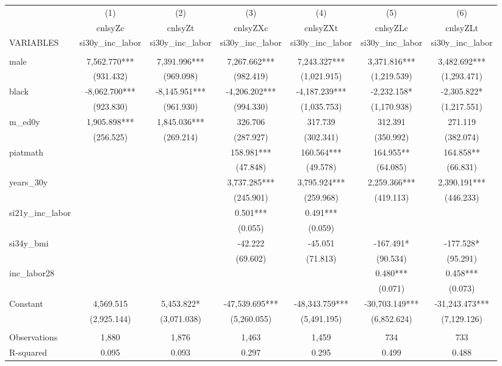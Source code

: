 \begin{tabular}{lcccccc} \hline
 & (1) & (2) & (3) & (4) & (5) & (6) \\
 & cnlsyZc & cnlsyZt & cnlsyZXc & cnlsyZXt & cnlsyZLc & cnlsyZLt \\
VARIABLES & si30y\_inc\_labor & si30y\_inc\_labor & si30y\_inc\_labor & si30y\_inc\_labor & si30y\_inc\_labor & si30y\_inc\_labor \\ \hline
 &  &  &  &  &  &  \\
male & 7,562.770*** & 7,391.996*** & 7,267.662*** & 7,243.327*** & 3,371.816*** & 3,482.692*** \\
 & (931.432) & (969.098) & (982.419) & (1,021.915) & (1,219.539) & (1,293.471) \\
black & -8,062.700*** & -8,145.951*** & -4,206.202*** & -4,187.239*** & -2,232.158* & -2,305.822* \\
 & (923.830) & (961.930) & (994.330) & (1,035.753) & (1,170.938) & (1,217.551) \\
m\_ed0y & 1,905.898*** & 1,845.036*** & 326.706 & 317.739 & 312.391 & 271.119 \\
 & (256.525) & (269.214) & (287.927) & (302.341) & (350.992) & (382.074) \\
piatmath &  &  & 158.981*** & 160.564*** & 164.955** & 164.858** \\
 &  &  & (47.848) & (49.578) & (64.085) & (66.831) \\
years\_30y &  &  & 3,737.285*** & 3,795.924*** & 2,259.366*** & 2,390.191*** \\
 &  &  & (245.901) & (259.968) & (419.113) & (446.233) \\
si21y\_inc\_labor &  &  & 0.501*** & 0.491*** &  &  \\
 &  &  & (0.055) & (0.059) &  &  \\
si34y\_bmi &  &  & -42.222 & -45.051 & -167.491* & -177.528* \\
 &  &  & (69.602) & (71.813) & (90.534) & (95.291) \\
inc\_labor28 &  &  &  &  & 0.480*** & 0.458*** \\
 &  &  &  &  & (0.071) & (0.073) \\
Constant & 4,569.515 & 5,453.822* & -47,539.695*** & -48,343.759*** & -30,703.149*** & -31,243.473*** \\
 & (2,925.144) & (3,071.038) & (5,260.055) & (5,491.195) & (6,852.624) & (7,129.126) \\
 &  &  &  &  &  &  \\
Observations & 1,880 & 1,876 & 1,463 & 1,459 & 734 & 733 \\
 R-squared & 0.095 & 0.093 & 0.297 & 0.295 & 0.499 & 0.488 \\ \hline
\end{tabular}
